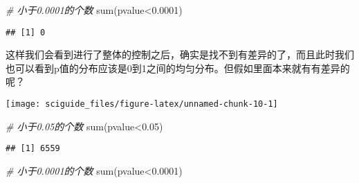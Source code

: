 \documentclass[]{tufte-book}
\newenvironment{Shaded}{}{}
\newcommand{\CommentTok}[1]{\textcolor[rgb]{0.38,0.63,0.69}{\textit{#1}}}
\newcommand{\ConstantTok}[1]{\textcolor[rgb]{0.53,0.00,0.00}{#1}}
\newcommand{\ControlFlowTok}[1]{\textcolor[rgb]{0.00,0.44,0.13}{\textbf{#1}}}
\newcommand{\DecValTok}[1]{\textcolor[rgb]{0.25,0.63,0.44}{#1}}
\newcommand{\FloatTok}[1]{\textcolor[rgb]{0.25,0.63,0.44}{#1}}
\newcommand{\FunctionTok}[1]{\textcolor[rgb]{0.02,0.16,0.49}{#1}}
\newcommand{\NormalTok}[1]{#1}
\newcommand{\OtherTok}[1]{\textcolor[rgb]{0.00,0.44,0.13}{#1}}
\newcommand{\SpecialCharTok}[1]{\textcolor[rgb]{0.25,0.44,0.63}{#1}}
\begin{document}
\begin{Shaded}
\begin{Highlighting}[]
\CommentTok{\# 小于0.0001的个数}
\FunctionTok{sum}\NormalTok{(pvalue}\SpecialCharTok{\textless{}}\FloatTok{0.0001}\NormalTok{)}
\end{Highlighting}
\end{Shaded}

\begin{verbatim}
## [1] 0
\end{verbatim}

这样我们会看到进行了整体的控制之后，确实是找不到有差异的了，而且此时我们也可以看到p值的分布应该是0到1之间的均匀分布。但假如里面本来就有有差异的呢？

\begin{Shaded}
\end{Shaded}

\texttt{[image: sciguide\_files/figure-latex/unnamed-chunk-10-1]}

\begin{Shaded}
\begin{Highlighting}[]
\CommentTok{\# 小于0.05的个数}
\FunctionTok{sum}\NormalTok{(pvalue}\SpecialCharTok{\textless{}}\FloatTok{0.05}\NormalTok{)}
\end{Highlighting}
\end{Shaded}

\begin{verbatim}
## [1] 6559
\end{verbatim}

\begin{Shaded}
\begin{Highlighting}[]
\CommentTok{\# 小于0.0001的个数}
\FunctionTok{sum}\NormalTok{(pvalue}\SpecialCharTok{\textless{}}\FloatTok{0.0001}\NormalTok{)}
\end{Highlighting}
\end{Shaded}
\end{document}

